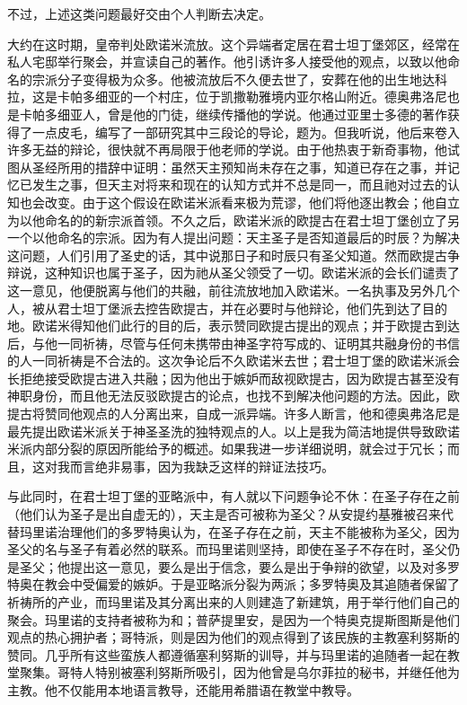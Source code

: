 不过，上述这类问题最好交由个人判断去决定。\par

大约在这时期，皇帝判处欧诺米流放。这个异端者定居在君士坦丁堡郊区，经常在私人宅邸举行聚会，并宣读自己的著作。他引诱许多人接受他的观点，以致以他命名的宗派分子变得极为众多。他被流放后不久便去世了，安葬在他的出生地达科拉，这是卡帕多细亚的一个村庄，位于凯撒勒雅境内亚尔格山附近。德奥弗洛尼也是卡帕多细亚人，曾是他的门徒，继续传播他的学说。他通过亚里士多德的著作获得了一点皮毛，编写了一部研究其中三段论的导论，题为。但我听说，他后来卷入许多无益的辩论，很快就不再局限于他老师的学说。由于他热衷于新奇事物，他试图从圣经所用的措辞中证明：虽然天主预知尚未存在之事，知道已存在之事，并记忆已发生之事，但天主对将来和现在的认知方式并不总是同一，而且祂对过去的认知也会改变。由于这个假设在欧诺米派看来极为荒谬，他们将他逐出教会；他自立为以他命名的的新宗派首领。不久之后，欧诺米派的欧提古在君士坦丁堡创立了另一个以他命名的宗派。因为有人提出问题：天主圣子是否知道最后的时辰？为解决这问题，人们引用了圣史的话，其中说那日子和时辰只有圣父知道。然而欧提古争辩说，这种知识也属于圣子，因为祂从圣父领受了一切。欧诺米派的会长们谴责了这一意见，他便脱离与他们的共融，前往流放地加入欧诺米。一名执事及另外几个人，被从君士坦丁堡派去控告欧提古，并在必要时与他辩论，他们先到达了目的地。欧诺米得知他们此行的目的后，表示赞同欧提古提出的观点；并于欧提古到达后，与他一同祈祷，尽管与任何未携带由神圣字符写成的、证明其共融身份的书信的人一同祈祷是不合法的。这次争论后不久欧诺米去世；君士坦丁堡的欧诺米派会长拒绝接受欧提古进入共融；因为他出于嫉妒而敌视欧提古，因为欧提古甚至没有神职身份，而且他无法反驳欧提古的论点，也找不到解决他问题的方法。因此，欧提古将赞同他观点的人分离出来，自成一派异端。许多人断言，他和德奥弗洛尼是最先提出欧诺米派关于神圣圣洗的独特观点的人。以上是我为简洁地提供导致欧诺米派内部分裂的原因所能给予的概述。如果我进一步详细说明，就会过于冗长；而且，这对我而言绝非易事，因为我缺乏这样的辩证法技巧。\par

与此同时，在君士坦丁堡的亚略派中，有人就以下问题争论不休：在圣子存在之前（他们认为圣子是出自虚无的），天主是否可被称为圣父？从安提约基雅被召来代替玛里诺治理他们的多罗特奥认为，在圣子存在之前，天主不能被称为圣父，因为圣父的名与圣子有着必然的联系。而玛里诺则坚持，即使在圣子不存在时，圣父仍是圣父；他提出这一意见，要么是出于信念，要么是出于争辩的欲望，以及对多罗特奥在教会中受偏爱的嫉妒。于是亚略派分裂为两派；多罗特奥及其追随者保留了祈祷所的产业，而玛里诺及其分离出来的人则建造了新建筑，用于举行他们自己的聚会。玛里诺的支持者被称为和；普萨提里安，是因为一个特奥克提斯图斯是他们观点的热心拥护者；哥特派，则是因为他们的观点得到了该民族的主教塞利努斯的赞同。几乎所有这些蛮族人都遵循塞利努斯的训导，并与玛里诺的追随者一起在教堂聚集。哥特人特别被塞利努斯所吸引，因为他曾是乌尔菲拉的秘书，并继任他为主教。他不仅能用本地语言教导，还能用希腊语在教堂中教导。\par

